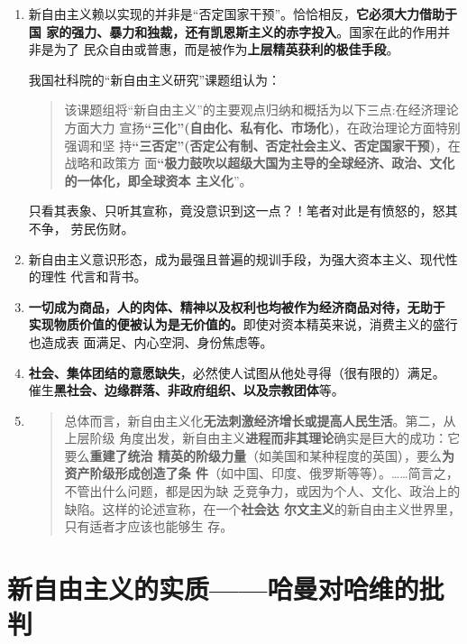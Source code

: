 \begin{enumerate}
\item 新自由主义赖以实现的并非是“否定国家干预”。恰恰相反，\textbf{它必须大力借助于国
    家的强力、暴力和独裁，还有凯恩斯主义的赤字投入}。国家在此的作用并非是为了
  民众自由或普惠，而是被作为\textbf{上层精英获利的极佳手段}。

  我国社科院的“新自由主义研究”课题组认为：
  \begin{quotation}
    该课题组将“新自由主义”的主要观点归纳和概括为以下三点:在经济理论方面大力
    宣扬\textbf{“三化”(自由化、私有化、市场化)}，在政治理论方面特别强调和坚
    持\textbf{“三否定”(否定公有制、否定社会主义、否定国家干预)}，在战略和政策方
    面\textbf{“极力鼓吹以超级大国为主导的全球经济、政治、文化的一体化，即全球资本
      主义化}”。\cite{newneo}
  \end{quotation}
  只看其表象、只听其宣称，竟没意识到这一点？！笔者对此是有愤怒的，怒其不争，
  劳民伤财。


\item 新自由主义意识形态，成为最强且普遍的规训手段，为强大资本主义、现代性的理性
  代言和背书。

\item \textbf{一切成为商品，人的肉体、精神以及权利也均被作为经济商品对待，无助于
    实现物质价值的便被认为是无价值的。}即使对资本精英来说，消费主义的盛行也造成表
  面满足、内心空洞、身份焦虑等。

\item \textbf{社会、集体团结的意愿缺失}，必然使人试图从他处寻得（很有限的）满足。
  催生\textbf{黑社会、边缘群落、非政府组织、以及宗教团体}等。

\item
  \begin{quotation}
    总体而言，新自由主义化\textbf{无法刺激经济增长或提高人民生活}。第二，从上层阶级
    角度出发，新自由主义\textbf{进程而非其理论}确实是巨大的成功：它要么\textbf{重建了统治
      精英的阶级力量}（如美国和某种程度的英国），要么\textbf{为资产阶级形成创造了条
      件}（如中国、印度、俄罗斯等等）。……简言之，不管出什么问题，都是因为缺
    乏竞争力，或因为个人、文化、政治上的缺陷。这样的论述宣称，在一个\textbf{社会达
      尔文主义}的新自由主义世界里，只有适者才应该也能够生
    存。
  \end{quotation}

\end{enumerate}

\section[新自由主义的实质]{新自由主义的实质——哈曼对哈维的批判}

